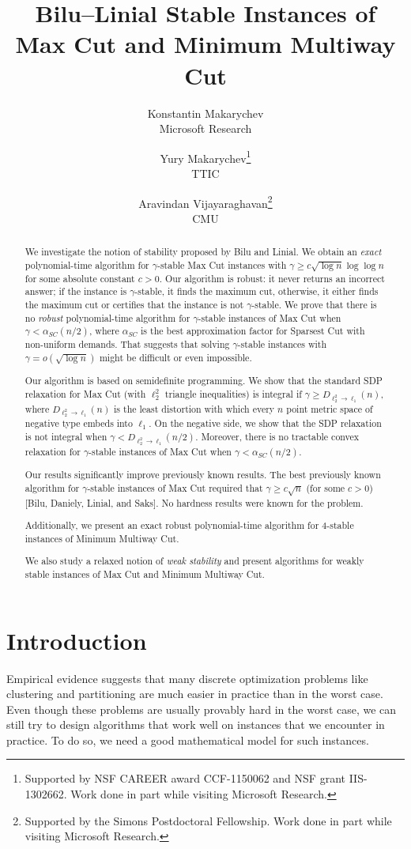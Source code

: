 \documentclass[twoside,leqno,twocolumn]{article}
\title{Bilu--Linial Stable Instances of Max Cut and Minimum Multiway Cut}
\author{Konstantin Makarychev\\Microsoft Research
\and Yury Makarychev\thanks{Supported by NSF CAREER award CCF-1150062 and NSF grant IIS-1302662. 
Work done in part while visiting Microsoft Research.}\\TTIC
\and Aravindan Vijayaraghavan\thanks{Supported by the Simons Postdoctoral Fellowship. Work done in part while visiting Microsoft Research.}\\CMU}
\date{}
\begin{document}
\maketitle
\begin{abstract}
We investigate the notion of stability proposed by Bilu and Linial. We obtain an \textit{exact} polynomial-time  algorithm for
$\gamma$-stable Max Cut instances with $\gamma \geq c\sqrt{\log n}\log\log n$ for some absolute constant $c > 0$. 
Our algorithm is robust: it never returns an incorrect answer;
if the instance is $\gamma$-stable, it finds the maximum cut, otherwise, it either finds the maximum cut or certifies that the instance is not $\gamma$-stable. We prove that there is no \textit{robust} polynomial-time algorithm for $\gamma$-stable instances of Max Cut
when $\gamma < \alpha_{SC}(n/2)$, where $\alpha_{SC}$ is the best approximation factor for Sparsest Cut with non-uniform demands. That suggests that solving $\gamma$-stable instances with $\gamma =o(\sqrt{\log n})$ might be difficult or even impossible.

Our algorithm is based on semidefinite programming. We show that the standard SDP relaxation for Max Cut 
(with $\ell_2^2$ triangle inequalities) is integral if 
$\gamma \geq D_{\ell_2^2\to \ell_1}(n)$, where $D_{\ell_2^2\to \ell_1}(n)$ is the least distortion with which every $n$ point metric space of negative type embeds into $\ell_1$. On the negative side, we show that the SDP relaxation is not integral when $\gamma < D_{\ell_2^2\to \ell_1}(n/2)$.
Moreover, there is no tractable convex relaxation for $\gamma$-stable instances of Max Cut
when $\gamma < \alpha_{SC}(n/2)$. 

Our results significantly improve previously known results. The best previously known algorithm for $\gamma$-stable instances of Max Cut 
required that $\gamma \geq  c\sqrt{n}$ (for some $c > 0$)  [Bilu, Daniely, Linial, and Saks]. No hardness results were known for the problem.

Additionally, we present an exact robust polynomial-time algorithm for $4$-stable instances of Minimum Multiway Cut.

We also study a relaxed notion of \textit{weak stability} and present algorithms for weakly stable instances of Max Cut and Minimum Multiway Cut.
\end{abstract}

\ifSODA\else
\setcounter{page}{0}
\thispagestyle{empty} \pagebreak
\fi


\section{Introduction} \label{sec:intro}
Empirical evidence suggests that many discrete optimization problems like clustering and partitioning
are much easier in practice than in the worst case. Even though these problems are usually provably 
hard in the worst case, we can still try to design algorithms that 
work well on instances that we encounter in practice. To do so, we need a good mathematical model 
for such instances. 
\end{document}
